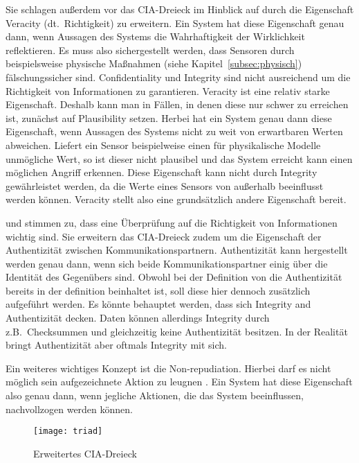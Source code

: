 Sie schlagen außerdem vor das CIA-Dreieck im Hinblick auf \cps durch die Eigenschaft Veracity (dt.~Richtigkeit) zu erweitern.
Ein System hat diese Eigenschaft genau dann, wenn Aussagen des Systems die Wahrhaftigkeit der  Wirklichkeit reflektieren.
Es muss also sichergestellt werden, dass Sensoren durch beispielsweise physische Maßnahmen (siehe Kapitel~\ref{subsec:physisch}) fälschungssicher sind.
Confidentiality und Integrity sind nicht ausreichend um die Richtigkeit von Informationen zu garantieren.
Veracity ist eine relativ starke Eigenschaft.
Deshalb kann man in Fällen, in denen diese nur schwer zu erreichen ist, zunächst auf Plausibility setzen.
Herbei hat ein System genau dann diese Eigenschaft, wenn Aussagen des Systems nicht zu weit von erwartbaren Werten abweichen.
Liefert ein Sensor beispielweise einen für physikalische Modelle unmögliche Wert, so ist dieser nicht plausibel und das System erreicht kann einen möglichen Angriff erkennen. \cite{GK16}
Diese Eigenschaft kann nicht durch Integrity gewährleistet werden, da die Werte eines Sensors von außerhalb beeinflusst werden können.
Veracity stellt also eine grundsätzlich andere Eigenschaft bereit.

\citeauthor{WYX+10} und \citeauthor{SFJ2017} stimmen zu, dass eine Überprüfung auf die Richtigkeit von Informationen wichtig sind.
Sie erweitern das CIA-Dreieck zudem um die Eigenschaft der Authentizität zwischen Kommunikationspartnern.
Authentizität kann hergestellt werden genau dann, wenn sich beide Kommunikationspartner einig über die Identität des Gegenübers sind.\label{def:authenticity}
Obwohl bei der Definition von \citeauthor{Cherdantseva2013} die Authentizität bereits in der definition beinhaltet ist, soll diese hier dennoch zusätzlich aufgeführt werden.
Es könnte behauptet werden, dass sich Integrity and Authentizität decken.
Daten können allerdings Integrity durch z.B.\ Checksummen und gleichzeitig keine Authentizität besitzen.
In der Realität bringt Authentizität aber oftmals Integrity mit sich.

Ein weiteres wichtiges Konzept ist die Non-repudiation.
Hierbei darf es nicht möglich sein aufgezeichnete Aktion zu leugnen \cite{NIST2013}.
Ein System hat diese Eigenschaft also genau dann, wenn jegliche Aktionen, die das System beeinflussen, nachvollzogen werden können. \label{def:nonrepudiation}

\begin{figure}
    \centering
    \texttt{[image: triad]}
    \caption{Erweitertes CIA-Dreieck}
    \label{fig:triad}
\end{figure}

